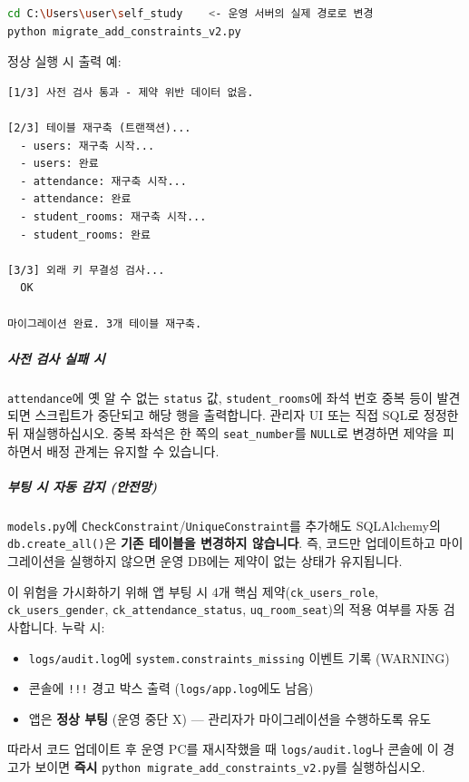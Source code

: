 \documentclass[a4paper,12pt]{article}
\begin{document}
\begin{lstlisting}[language=bash, caption=제약 마이그레이션 실행]
cd C:\Users\user\self_study    <- 운영 서버의 실제 경로로 변경
python migrate_add_constraints_v2.py
\end{lstlisting}

정상 실행 시 출력 예:

\begin{lstlisting}
[1/3] 사전 검사 통과 - 제약 위반 데이터 없음.

[2/3] 테이블 재구축 (트랜잭션)...
  - users: 재구축 시작...
  - users: 완료
  - attendance: 재구축 시작...
  - attendance: 완료
  - student_rooms: 재구축 시작...
  - student_rooms: 완료

[3/3] 외래 키 무결성 검사...
  OK

마이그레이션 완료. 3개 테이블 재구축.
\end{lstlisting}

\subparagraph*{사전 검사 실패 시}

\texttt{attendance}에 옛 알 수 없는 \texttt{status} 값, \texttt{student\_rooms}에 좌석 번호 중복 등이 발견되면
스크립트가 중단되고 해당 행을 출력합니다.
관리자 UI 또는 직접 SQL로 정정한 뒤 재실행하십시오. 중복 좌석은 한 쪽의 \texttt{seat\_number}를
\texttt{NULL}로 변경하면 제약을 피하면서 배정 관계는 유지할 수 있습니다.

\subparagraph*{부팅 시 자동 감지 (안전망)}

\texttt{models.py}에 \texttt{CheckConstraint}/\texttt{UniqueConstraint}를 추가해도
SQLAlchemy의 \texttt{db.create\_all()}은 \textbf{기존 테이블을 변경하지 않습니다}.
즉, 코드만 업데이트하고 마이그레이션을 실행하지 않으면 운영 DB에는 제약이 없는 상태가 유지됩니다.

이 위험을 가시화하기 위해 앱 부팅 시 4개 핵심 제약(\texttt{ck\_users\_role},
\texttt{ck\_users\_gender}, \texttt{ck\_attendance\_status}, \texttt{uq\_room\_seat})의 적용 여부를
자동 검사합니다. 누락 시:

\begin{itemize}[leftmargin=1.5em]
  \item \texttt{logs/audit.log}에 \texttt{system.constraints\_missing} 이벤트 기록 (WARNING)
  \item 콘솔에 \texttt{!!!} 경고 박스 출력 (\texttt{logs/app.log}에도 남음)
  \item 앱은 \textbf{정상 부팅} (운영 중단 X) --- 관리자가 마이그레이션을 수행하도록 유도
\end{itemize}

따라서 코드 업데이트 후 운영 PC를 재시작했을 때 \texttt{logs/audit.log}나 콘솔에
이 경고가 보이면 \textbf{즉시} \texttt{python migrate\_add\_constraints\_v2.py}를 실행하십시오.
\end{document}
